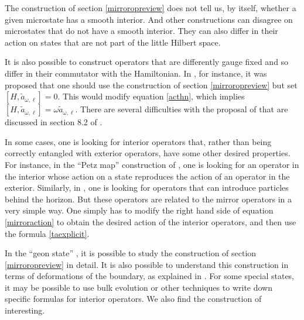 \documentclass[12pt]{article}
\newcommand{\cop}[1]{#1}
\def\ta{\widetilde{\cop{a}}}
\begin{document}
The construction of section \ref{mirroropreview} does not tell us, by itself, whether a given microstate has a smooth interior. And other constructions can disagree on microstates that do not have a smooth interior.  They can also differ in their action on states that are not part of the little Hilbert space.

It is also possible to construct operators that are differently gauge fixed and so differ in their commutator with the Hamiltonian. In \cite{Harlow:2014yoa}, for instance,  it was proposed that one should use the construction of section \ref{mirroropreview}  but set $[H, \ta_{\omega, \ell}] = 0$. This would modify equation \eqref{acthn}, which implies $[H, \ta_{\omega, \ell}] = \omega \ta_{\omega, \ell}$. There are several difficulties with the proposal of \cite{Harlow:2014yoa} that are discussed in section 8.2 of \cite{Papadodimas:2015jra}.

In some cases, one is looking for interior operators that, rather than being correctly entangled with exterior operators, have some other desired properties.  For instance, in the ``Petz map'' construction of \cite{Penington:2019kki}, one is looking for an operator in the interior whose action on a state reproduces the action of an operator in the exterior. Similarly, in \cite{Kourkoulou:2017zaj}, one is looking for operators that can introduce particles behind the horizon. But these operators are related to the mirror operators in a very simple way. One simply has to modify the right hand side of equation \eqref{mirroraction} to obtain the desired action of the interior operators, and then use the formula \eqref{taexplicit}.

In the ``geon state'' \cite{Guica:2014dfa}, it is possible to study the construction of section \ref{mirroropreview} in detail. It is also possible to understand this construction in terms of deformations of the boundary, as explained in \cite{deBoer:2019kyr,deBoer:2018ibj}. For some special states, it may be possible to use bulk evolution or other techniques \cite{Heemskerk:2012mn,Almheiri:2017fbd} to write down specific formulas for interior operators. We also find the construction of  \cite{Nomura:2018kia,Nomura:2019dlz,Nomura:2019qps,Nomura:2020ska}  interesting.
\end{document}
